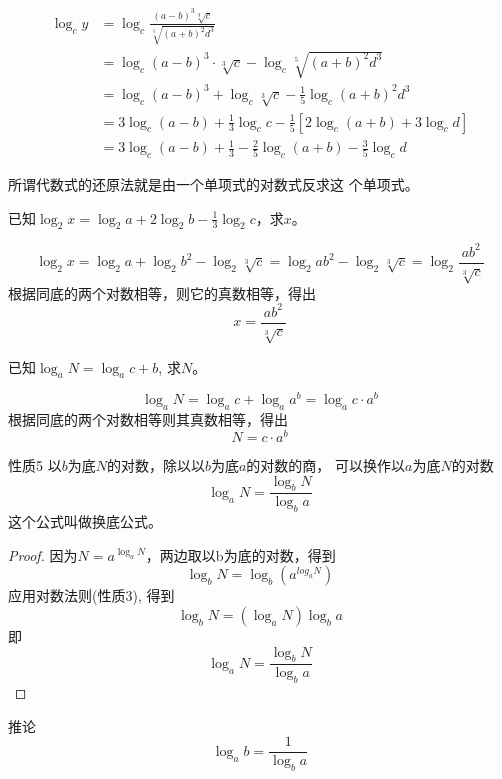 \begin{solution}
\[\begin{split}
    \log_c y&=\log_c \frac{(a-b)^3\sqrt[3]{c}}{\sqrt[5]{(a+b)^2d^3}}\\ 
&=\log_c (a-b)^3\cdot \sqrt[3]{c}  -\log_c \sqrt[5]{(a+b)^2d^3}\\
&=\log_c (a-b)^3+ \log_c \sqrt[3]{c}  -\frac{1}{5}\log_c {(a+b)^2d^3}\\
&=3\log_c (a-b)+\frac{1}{3}\log_c  c-\frac{1}{5}[2\log_c (a+b)+3\log_c d]\\
&=3\log_c (a-b)+\frac{1}{3}-\frac{2}{5}\log_c (a+b)-\frac{3}{5}\log_c d
\end{split}\]
\end{solution}

所谓代数式的还原法就是由一个单项式的对数式反求这
个单项式。

\begin{example}
已知$\log_2 x=\log_2 a+2\log_2 b-\frac{1}{3}\log_2 c$，求$x$。
\end{example}

\begin{solution}
    \[\log_2 x=\log_2 a+\log_2 b^2-\log_2 \sqrt[3]{c}=\log_2 ab^2-\log_2 \sqrt[3]{c}
=\log_2 \frac{ab^2}{\sqrt[3]{c}}\]
根据同底的两个对数相等，则它的真数相等，得出
\[x=\frac{ab^2}{\sqrt[3]{c}}\]
\end{solution}    


\begin{example}
    已知$\log_a N=\log_ac+b$, 求$N$。
\end{example}


\begin{solution}
\[\log_a N=\log_a c+\log_a a^b=\log_a c\cdot a^b\]
根据同底的两个对数相等则其真数相等，得出
\[N=c\cdot a^b\] 
\end{solution}

\begin{blk}{性质5}
    以$b$为底$N$的对数，除以以$b$为底$a$的对数的商，
可以换作以$a$为底$N$的对数
\[\log_a N=\frac{\log_b N}{\log_b a}\]
这个公式叫做换底公式。
\end{blk}


\begin{proof}
    因为$N=a^{\log_a N}$，两边取以b为底的对数，得到
    \[\log_b N = \log_b (a^{log_aN} )\]
    应用对数法则(性质3), 得到
\[\log_b N=(\log_a N)\log_ba\]
即
\[\log_a N=\frac{\log_b N}{\log_b a}\]

\end{proof}


\begin{blk}{推论}
    $$\log_ab=\frac{1}{\log_ba}$$
\end{blk}


